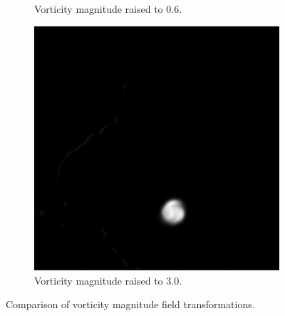 \documentclass{article}
\begin{document}
\begin{figure}[h!]
\begin{subfigure}{0.32\textwidth}
        \caption{Vorticity magnitude raised to 0.6.}
    \end{subfigure}
    \hfill
    \begin{subfigure}{0.32\textwidth}
        \centering
        \includegraphics[width=\textwidth]{pow_3_0.png}
        \caption{Vorticity magnitude raised to 3.0.}
    \end{subfigure}
    \caption{Comparison of vorticity magnitude field transformations.}
\end{figure}

\newpage
\end{document}
